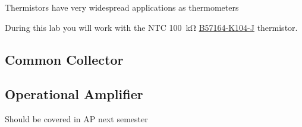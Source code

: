 Thermistors have very widespread applications as thermometers

During this lab you will work with the \ac{NTC} \SI{100}{\kilo\ohm} \href{http://www.farnell.com/datasheets/91602.pdf}{B57164-K104-J} thermistor.

\subsection{Common Collector}
\subsection{Operational Amplifier}
Should be covered in AP next semester










